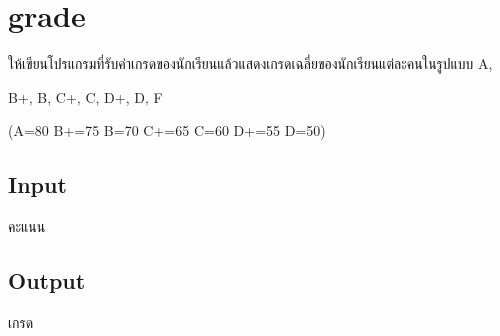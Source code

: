 \documentclass{article}
\begin{document}
\section*{grade}

ให้เขียนโปรแกรมที่รับค่าเกรดของนักเรียนแล้วแสดงเกรดเฉลี่ยของนักเรียนแต่ละคนในรูปแบบ A,

B+, B, C+, C, D+, D, F



(A=80 B+=75 B=70 C+=65 C=60 D+=55 D=50)



\subsection*{Input}
คะแนน



\subsection*{Output}
เกรด
\end{document}

